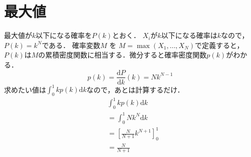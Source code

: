 \section{最大値}
最大値が$k$以下になる確率を$P(k)$とおく．
$X_i$が$k$以下になる確率は$k$なので，$P(k) = k^N$である．
確率変数$M$ を $M = \max(X_1, \ldots, X_N)$で定義すると，$P(k)$は$M$の累積密度関数に相当する．微分すると確率密度関数$p(k)$がわかる．
\[
p(k) = \frac{\mathrm{d}P}{\mathrm{d}k}(k) = Nk^{N-1}
\]
求めたい値は$\int_0^1 k p(k) \mathrm{d}k$なので，あとは計算するだけ．
\begin{align*}
  &\int_0^1 k p(k) \mathrm{d}k\\
  &= \int_0^1 Nk^N \mathrm{d}k\\
  &= \left [ \frac{N}{N+1}k^{N+1} \right ]_0^1\\
  &= \frac{N}{N+1}
\end{align*}
